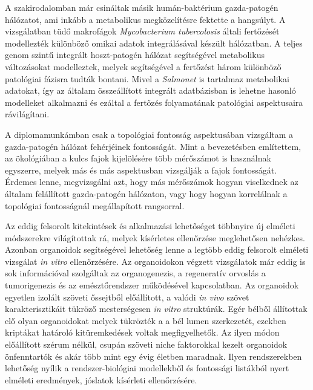 \documentclass[a4paper,12pt]{article}
\begin{document}
 		A szakirodalomban már csináltak másik humán-baktérium gazda-patogén hálózatot, ami inkább a metabolikus megközelítésre fektette a hangsúlyt. A vizsgálatban tüdő makrofágok \textit{Mycobacterium tubercolosis} általi fertőzését modellezték különböző omikai adatok integrálásával készült hálózatban. A teljes genom szintű integrált hoszt-patogén hálózat segítségével metabolikus változásokat modelleztek, melyek segítségével a fertőzést három különböző patológiai fázisra tudták bontani. \cite{discussion_alveolar_macrophage} Mivel a \textit{Salmonet} is tartalmaz metabolikai adatokat, így az általam összeállított integrált adatbázisban is lehetne hasonló modelleket alkalmazni és ezáltal a fertőzés folyamatának patológiai aspektusaira rávilágítani.
		
		A diplomamunkámban csak a topológiai fontosság aspektusában vizsgáltam a gazda-patogén hálózat fehérjéinek fontosságát. Mint a bevezetésben említettem, az ökológiában a kulcs fajok kijelölésére több mérőszámot is használnak egyszerre, melyek más és más aspektusban vizsgálják a fajok fontosságát.\cite{jordan_comparison} \cite{ti} Érdemes lenne, megvizsgálni azt, hogy más mérőszámok hogyan viselkednek az általam felállított gazda-patogén hálózaton, vagy hogy hogyan korrelálnak a topológiai fontosságnál megállapított rangsorral.

		Az eddig felsorolt kitekintések és alkalmazási lehetőséget többnyire új elméleti módszerekre világítottak rá, melyek kísérletes ellenőrzése meglehetősen nehézkes. Azonban organoidok segítségével lehetőség lenne a legtöbb eddig felsorolt elméleti vizsgálat \textit{in vitro} ellenőrzésére. Az organoidokon végzett vizsgálatok már eddig is sok információval szolgáltak az organogenezis, a regeneratív orvoslás a tumorigenezis és az emésztőrendszer működésével kapcsolatban. Az organoidok egyetlen izolált szöveti őssejtből előállított, a valódi \textit{in vivo} szövet karakterisztikáit tükröző mesterségesen \textit{in vitro} struktúrák. \cite{organoid}
		Egér bélből állítottak elő olyan organoidokat melyek tükrözték a a bél lumen szerkezetét, ezekben kriptákat határoló kitüremkedések voltak megfigyelhetők. Az ilyen módon előállított szérum nélkül, csupán szöveti niche faktorokkal kezelt organoidok önfenntartók és akár több mint egy évig életben maradnak. \cite{organoid} Ilyen rendszerekben lehetőség nyílik a rendszer-biológiai modellekből és fontossági listákból nyert elméleti eredmények, jóslatok kísérleti ellenőrzésére.
		
\end{document}
